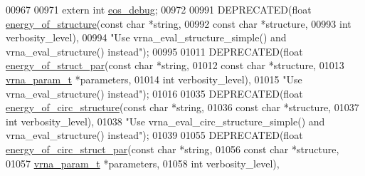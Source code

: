 \begin{DoxyCode}
00967 
00971 \textcolor{keyword}{extern} \textcolor{keywordtype}{int}  \hyperlink{group__eval__deprecated_ga567530678f6260a1a649a5beca5da4c5}{eos\_debug};
00972 
00991 DEPRECATED(\textcolor{keywordtype}{float} \hyperlink{group__eval__deprecated_gaf93986cb3cb29770ec9cca69c9fab8cf}{energy\_of\_structure}(\textcolor{keyword}{const} \textcolor{keywordtype}{char} *\textcolor{keywordtype}{string},
00992                                      \textcolor{keyword}{const} \textcolor{keywordtype}{char} *structure,
00993                                      \textcolor{keywordtype}{int}        verbosity\_level),
00994            \textcolor{stringliteral}{"Use vrna\_eval\_structure\_simple() and vrna\_eval\_structure() instead"});
00995 
01011 DEPRECATED(\textcolor{keywordtype}{float} \hyperlink{group__eval__deprecated_gaf9d064d3c496de42eca6734a96fd2090}{energy\_of\_struct\_par}(\textcolor{keyword}{const} \textcolor{keywordtype}{char}    *\textcolor{keywordtype}{string},
01012                                       \textcolor{keyword}{const} \textcolor{keywordtype}{char}    *structure,
01013                                       \hyperlink{group__energy__parameters_structvrna__param__s}{vrna\_param\_t}  *parameters,
01014                                       \textcolor{keywordtype}{int}           verbosity\_level),
01015            \textcolor{stringliteral}{"Use vrna\_eval\_structure() instead"});
01016 
01035 DEPRECATED(\textcolor{keywordtype}{float} \hyperlink{group__eval__deprecated_gaeb14f3664aec67fc03268ac75253f0f8}{energy\_of\_circ\_structure}(\textcolor{keyword}{const} \textcolor{keywordtype}{char}  *\textcolor{keywordtype}{string},
01036                                           \textcolor{keyword}{const} \textcolor{keywordtype}{char}  *structure,
01037                                           \textcolor{keywordtype}{int}         verbosity\_level),
01038            \textcolor{stringliteral}{"Use vrna\_eval\_circ\_structure\_simple() and vrna\_eval\_structure() instead"});
01039 
01055 DEPRECATED(\textcolor{keywordtype}{float} \hyperlink{group__eval__deprecated_ga3f01f9744ba6a40555eb4d81fc77f6df}{energy\_of\_circ\_struct\_par}(\textcolor{keyword}{const} \textcolor{keywordtype}{char}   *\textcolor{keywordtype}{string},
01056                                            \textcolor{keyword}{const} \textcolor{keywordtype}{char}   *structure,
01057                                            \hyperlink{group__energy__parameters_structvrna__param__s}{vrna\_param\_t} *parameters,
01058                                            \textcolor{keywordtype}{int}          verbosity\_level),

\end{DoxyCode}
